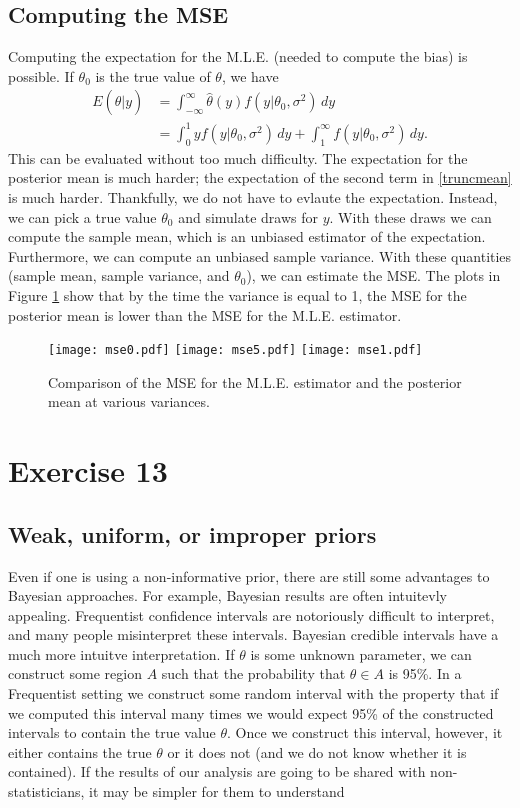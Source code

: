 \documentclass[a4paper,10pt]{article}
\newcommand{\htheta}{\hat{\theta}}
\begin{document}
\subsection{Computing the MSE}
Computing the expectation for the M.L.E. (needed to compute the bias) is possible.  If $\theta_0$ is the true value of $\theta$, we have
\begin{align*}
 E(\htheta|y) &= \int_{-\infty}^\infty \htheta(y)f(y|\theta_0, \sigma^2) \, dy \\
 &= \int_0^1 yf(y|\theta_0, \sigma^2) \, dy + \int_1^\infty f(y|\theta_0, \sigma^2) \, dy.
\end{align*}
This can be evaluated without too much difficulty.  The expectation for the posterior mean is much harder; the expectation of the second term in \ref{truncmean} is much harder.  Thankfully, we do not have to evlaute the expectation.  Instead, we can pick a true value $\theta_0$ and simulate draws for $y$.  With these draws we can compute the sample mean, which is an unbiased estimator of the expectation.  Furthermore, we can compute an unbiased sample variance.  With these quantities (sample mean, sample variance, and $\theta_0$), we can estimate the MSE.   The plots in Figure \ref{mseplots} show that by the time the variance is equal to 1, the MSE for the posterior mean is lower than the MSE for the M.L.E. estimator.  

\begin{figure}
 \centering
 \texttt{[image: mse0.pdf]}
 \texttt{[image: mse5.pdf]}
 \texttt{[image: mse1.pdf]}
 \caption{\label{mseplots} Comparison of the MSE for the M.L.E. estimator and the posterior mean at various variances.}
\end{figure}


\section{Exercise 13}
\subsection{Weak, uniform, or improper priors}
Even if one is using a non-informative prior, there are still some advantages to Bayesian approaches.  For example, Bayesian results are often intuitevly appealing.  Frequentist confidence intervals are notoriously difficult to interpret, and many people misinterpret these intervals.  Bayesian credible intervals have a much more intuitve interpretation.  If $\theta$ is some unknown parameter, we can construct some region $A$ such that the probability that $\theta \in A$ is 95\%.  In a Frequentist setting we construct some random interval with the property that if we computed this interval many times we would expect 95\% of the constructed intervals to contain the true value $\theta$.  Once we construct this interval, however, it either contains the true $\theta$ or it does not (and we do not know whether it is contained).  If the results of our analysis are going to be shared with non-statisticians, it may be simpler for them to understand 
\end{document}
